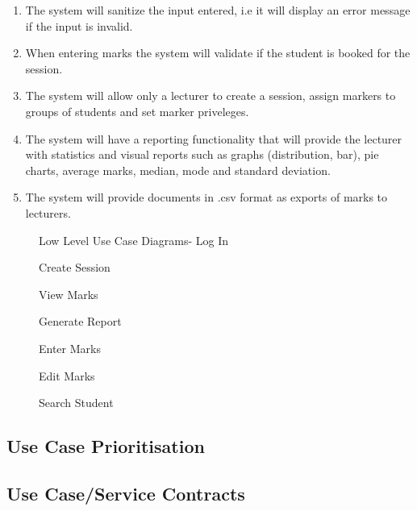 \documentclass[a4paper]{article}
\begin{document}
\begin{enumerate}
		\item The system will sanitize the input entered, i.e it will display an error message if the input is invalid.
		\item When entering marks the system will validate if the student is booked for the session.
		\item The system will allow only a lecturer to create a session, assign markers to groups of students and set marker priveleges.
		\item The system will have a reporting functionality that will provide the lecturer with statistics and visual reports such as graphs (distribution, bar), pie charts, average marks, median, mode and standard deviation. 
		\item The system will provide documents in .csv format as exports of marks to lecturers.
		
		\end{enumerate}
			\begin{figure}[h]
				\caption{Low Level Use Case Diagrams- Log In}
			\end{figure}
			\begin{figure}[h]
				\caption{Create Session}
			\end{figure}
			\begin{figure}[h]
				\caption{View Marks}
			\end{figure}
			\begin{figure}[h]
				\caption{Generate Report}
			\end{figure}
			\begin{figure}[h]
				\caption{Enter Marks}
			\end{figure}
			\begin{figure}[h]
				\caption{Edit Marks}
			\end{figure}
			\begin{figure}[h]
				\caption{Search Student}
			\end{figure}

		\subsection{Use Case Prioritisation}

		\subsection{Use Case/Service Contracts}
			
\end{document}
